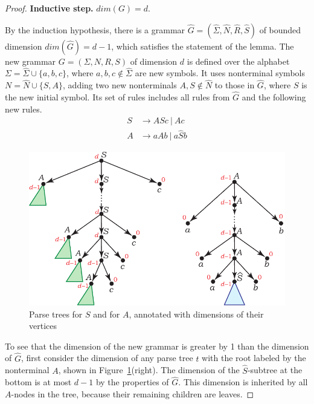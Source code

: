 \documentclass[runningheads]{llncs}
\begin{document}
\begin{proof}
\textbf{Inductive step.} $dim(G) = d$.

By the induction hypothesis,
there is a grammar $\widehat{G} = (\widehat{\Sigma}, \widehat{N}, \widehat{R}, \widehat{S})$
of bounded dimension $dim(\widehat{G}) = d-1$,
which satisfies the statement of the lemma.
The new grammar $G = (\Sigma, N, R, S)$ of dimension $d$
is defined over the alphabet 
$\Sigma = \widehat{\Sigma} \cup \{a, b, c\}$,
where $a, b, c \not\in \widehat{\Sigma}$ are new symbols.
It uses nonterminal symbols
$N = \widehat{N} \cup \{S, A\}$,
adding two new nonterminals $A, S \not\in \widehat{N}$ to those in $\widehat{G}$,
where $S$ is the new initial symbol.
Its set of rules includes all rules from $\widehat{G}$
and the following new rules.
\begin{align*}
	S &\to A S c \ | \ A c \\
	A &\to a A b \ | \ a \widehat{S} b
\end{align*}

\begin{figure}[t]
\centering
\includegraphics[scale=0.9]{rational_index_parse_tree_S_A.pdf}
\caption{Parse trees for $S$ and for $A$, annotated with dimensions of their vertices}
\label{dimsubtree}
\end{figure}

To see that the dimension of the new grammar is greater by 1 than the dimension of $\widehat{G}$,
first consider the dimension of any parse tree $t$ with the root labeled by the nonterminal $A$,
shown in Figure~\ref{dimsubtree}(right).
The dimension of the $\widehat{S}$-subtree at the bottom
is at most $d-1$ by the properties of $\widehat{G}$.
This dimension is inherited by all $A$-nodes in the tree,
because their remaining children are leaves.


\end{proof}
\end{document}
